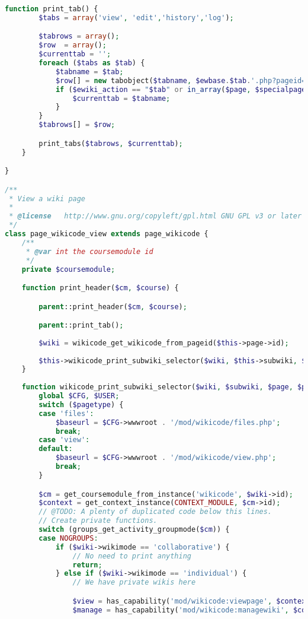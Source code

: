 \begin{lstlisting}[language=PHP]
	function print_tab() {
		$tabs = array('view', 'edit','history','log');

        $tabrows = array();
        $row  = array();
        $currenttab = '';
        foreach ($tabs as $tab) {
            $tabname = $tab;
            $row[] = new tabobject($tabname, $ewbase.$tab.'.php?pageid='.$this->page->id, $tabname);
            if ($ewiki_action == "$tab" or in_array($page, $specialpages)) {
                $currenttab = $tabname;
            }
        }
        $tabrows[] = $row;

        print_tabs($tabrows, $currenttab);
	}

}

/**
 * View a wiki page
 *
 * @license   http://www.gnu.org/copyleft/gpl.html GNU GPL v3 or later
 */
class page_wikicode_view extends page_wikicode {
    /**
     * @var int the coursemodule id
     */
    private $coursemodule;

    function print_header($cm, $course) {

        parent::print_header($cm, $course);

        parent::print_tab();
		
		$wiki = wikicode_get_wikicode_from_pageid($this->page->id);
		
        $this->wikicode_print_subwiki_selector($wiki, $this->subwiki, $this->page, 'view');
    }
	
	function wikicode_print_subwiki_selector($wiki, $subwiki, $page, $pagetype = 'view') {
        global $CFG, $USER;
        switch ($pagetype) {
        case 'files':
            $baseurl = $CFG->wwwroot . '/mod/wikicode/files.php';
            break;
        case 'view':
        default:
            $baseurl = $CFG->wwwroot . '/mod/wikicode/view.php';
            break;
        }

        $cm = get_coursemodule_from_instance('wikicode', $wiki->id);
        $context = get_context_instance(CONTEXT_MODULE, $cm->id);
        // @TODO: A plenty of duplicated code below this lines.
        // Create private functions.
        switch (groups_get_activity_groupmode($cm)) {
        case NOGROUPS:
            if ($wiki->wikimode == 'collaborative') {
                // No need to print anything
                return;
            } else if ($wiki->wikimode == 'individual') {
                // We have private wikis here

                $view = has_capability('mod/wikicode:viewpage', $context);
                $manage = has_capability('mod/wikicode:managewiki', $context);


\end{lstlisting}
